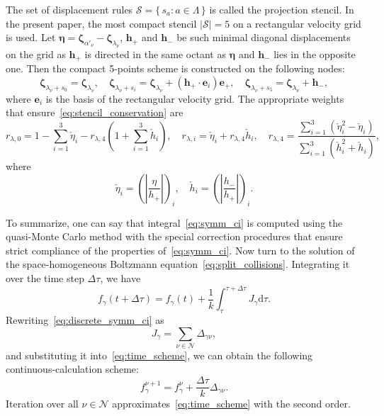 \documentclass[final]{jfm} %
\newcommand{\dd}{\mathrm{d}}
\newcommand{\bzeta}{\boldsymbol{\zeta}}
\newcommand{\bh}{\boldsymbol{h}}
\newcommand{\Nu}{\mathcal{N}}
\newcommand{\Set}[2]{\{\,{#1}:{#2}\,\}}
\begin{document}
The set of displacement rules \(\mathcal{S} = \Set{s_a}{a\in\Lambda}\)
is called the projection stencil.
In the present paper, the most compact stencil \(|\mathcal{S}|=5\) on a rectangular velocity grid is used.
Let \(\boldsymbol{\eta} = \bzeta_{\alpha'_\nu} - \bzeta_{\lambda_\nu}\),
\(\bh_+\) and \(\bh_-\) be such minimal diagonal displacements on the grid
as \(\bh_+\) is directed in the same octant as \(\boldsymbol{\eta}\)
and \(\bh_-\) lies in the opposite one.
Then the compact 5-points scheme is constructed on the following nodes:
\begin{equation}\label{eq:stencil_nodes}
    \bzeta_{\lambda_\nu+s_0} = \bzeta_{\lambda_\nu}, \quad
    \bzeta_{\lambda_\nu+s_i} = \bzeta_{\lambda_\nu} + (\bh_+\cdot \boldsymbol{e}_i)\boldsymbol{e}_+, \quad
    \bzeta_{\lambda_\nu+s_5} = \bzeta_{\lambda_\nu} + \bh_-,
\end{equation}
where \(\boldsymbol{e}_i\) is the basis of the rectangular velocity grid.
The appropriate weights that ensure~\eqref{eq:stencil_conservation} are
\begin{equation}\label{eq:stencil_weights}
    r_{\lambda,0} = 1 - \sum_{i=1}^3 \check{\eta}_i - r_{\lambda,4}\left(1+\sum_{i=1}^3 \check{h}_i\right), \quad
    r_{\lambda,i} = \check{\eta}_i + r_{\lambda,4}\check{h}_i, \quad
    r_{\lambda,4} = \frac{\displaystyle\sum_{i=1}^3(\check{\eta}_i^2 - \check{\eta}_i)}
        {\displaystyle\sum_{i=1}^3(\check{h}_i^2 + \check{h}_i)},
\end{equation}
where
\begin{equation}\label{eq:stencil_variables}
    \check{\eta}_i = \left(\left|\frac{\eta}{h_+}\right|\right)_i, \quad
    \check{h}_i = \left(\left|\frac{h_-}{h_+}\right|\right)_i.
\end{equation}

To summarize, one can say that integral~\eqref{eq:symm_ci} is computed using the quasi-Monte Carlo method
with the special correction procedures that ensure strict compliance of the properties of~\eqref{eq:symm_ci}.
Now turn to the solution of the space-homogeneous Boltzmann equation~\eqref{eq:split_collisions}.
Integrating it over the time step \(\Delta\tau\), we have
\begin{equation}\label{eq:time_scheme}
    f_\gamma(t+\Delta\tau) = f_\gamma(t) + \frac1k \int_\tau^{\tau+\Delta\tau} J_\gamma \dd\tau.
\end{equation}
Rewriting~\eqref{eq:discrete_symm_ci} as
\begin{equation}\label{eq:discrete_short_ci}
    J_\gamma = \sum_{\nu\in\Nu} \Delta_{\gamma\nu},
\end{equation}
and substituting it into~\eqref{eq:time_scheme},
we can obtain the following continuous-calculation scheme:
\begin{equation}\label{eq:continuous_scheme}
    f_\gamma^{\nu+1} = f_\gamma^\nu + \frac{\Delta\tau}{k}\Delta_{\gamma\nu}.
\end{equation}
Iteration over all \(\nu\in\Nu\) approximates~\eqref{eq:time_scheme}
with the second order.
\end{document}
